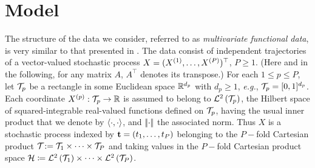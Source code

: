 \section{Model} %
\label{sec:model}

The structure of the data we consider, referred to as \emph{multivariate functional data}, is very similar to that presented in \cite{happMultivariateFunctionalPrincipal2015}. The data consist of independent trajectories of a vector-valued stochastic process $X = (X^{(1)}, \dots, X^{(P)})^\top$, $P\geq 1$. (Here and in the following, for any matrix $A$, $A^\top$ denotes its transpose.) For each $1 \leq p \leq P$, let $\mathcal{T}_{p}$ be a rectangle in some Euclidean space $\mathbb{R}^{d_p}$ with $d_p \geq 1$, \emph{e.g.}, $\mathcal{T}_{p} = [0,1]^{d_p}$. Each coordinate $X^{(p)} : \mathcal{T}_{p} \rightarrow \mathbb{R}$ is assumed to belong to  $\mathcal{L}^{2}\left(\mathcal{T}_{p}\right)$, the Hilbert space of squared-integrable real-valued functions defined on $\mathcal{T}_{p}$, having the usual inner product that we denote by $\langle\cdot, \cdot\rangle$, and $\left|\!\left|\cdot\right|\!\right|$ the associated norm. Thus $X$ is a stochastic process indexed by $\mathbf{t} = (t_1, \ldots, t_P)$ belonging to the $P-$fold Cartesian product $\mathcal{T}_{} : =\mathcal{T}_{1} \times \cdots \times \mathcal{T}_{P}$ and taking values in the $P-$fold Cartesian product space $\mathcal{H} \coloneqq \mathcal{L}^{2}\left(\mathcal{T}_{1}\right) \times \dots \times \mathcal{L}^{2}\left(\mathcal{T}_{P}\right)$. 

